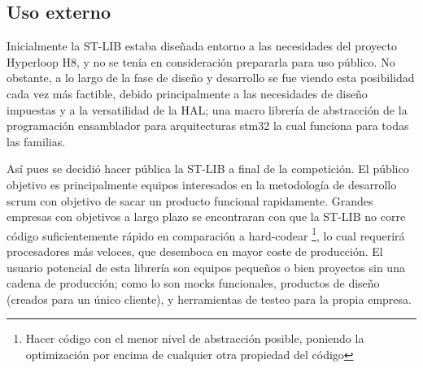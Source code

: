 \documentclass{report}
\begin{document}
\subsection{Uso externo}
Inicialmente la ST-LIB estaba diseñada entorno a las necesidades del proyecto Hyperloop H8, y no se tenía en consideración prepararla para uso público. No obstante, a lo largo de la fase de diseño y desarrollo se fue viendo esta posibilidad cada vez más factible, debido principalmente a las necesidades de diseño impuestas y a la versatilidad de la HAL; una macro librería de abstracción de la programación ensamblador para arquitecturas stm32 la cual funciona para todas las familias. \par

Así pues se decidió hacer pública la ST-LIB a final de la competición. El público objetivo es principalmente equipos interesados en la metodología de desarrollo scrum con objetivo de sacar un producto funcional rapidamente. Grandes empresas con objetivos a largo plazo se encontraran con que la ST-LIB no corre código suficientemente rápido en comparación a hard-codear \footnote{Hacer código con el menor nivel de abstracción posible, poniendo la optimización por encima de cualquier otra propiedad del código}, lo cual requerirá procesadores más veloces, que desemboca en mayor coste de producción. El usuario potencial de esta librería son equipos pequeños o bien proyectos sin una cadena de producción; como lo son mocks funcionales, productos de diseño (creados para un único cliente), y herramientas de testeo para la propia empresa. 
\end{document}
